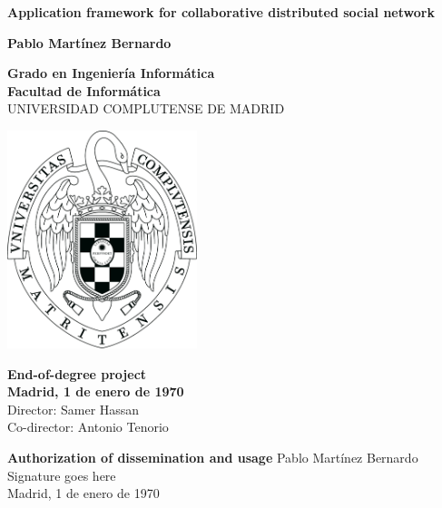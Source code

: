 \setcounter{page}{1}

\newpage
\thispagestyle{cover}
\begin{center}
  {\Huge \bf Application framework for collaborative distributed social network}

  \vfill
  {\LARGE\bf Pablo Martínez Bernardo}

  \vfill

  {\Large\bf Grado en Ingeniería Informática\\}
  {\Large\bf Facultad de Informática\\}
  \vspace*{0.2cm}
  {UNIVERSIDAD COMPLUTENSE DE MADRID}
  \vspace*{0.9cm}
  
   \begin{center}
   \includegraphics[width=157pt, height=180pt]{ucmlogo.png}
   \end{center}
  
  \vspace*{0.5cm}

  {\large\bf End-of-degree project\\
             Madrid, 1 de enero de 1970\\}
  \vspace*{0.7cm}
  {\large Director: Samer Hassan\\
          Co-director: Antonio Tenorio}
  \rhead{}
  \rfoot{}
  \fancyhf{}

\end{center}

\newpage
\thispagestyle{empty}
\begin{center}
  \textbf{\Huge Authorization of dissemination and usage}
  \vfill
  {\Large Pablo Martínez Bernardo\\}
  \vspace*{1cm}
  {\Huge Signature goes here\\}
  \vspace*{1cm}
  {\Large Madrid, 1 de enero de 1970}
  \vfill
\end{center}

